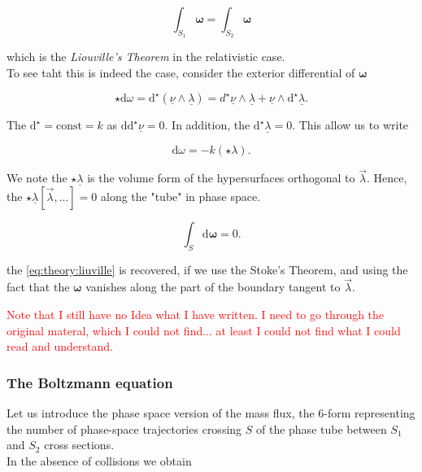 \documentclass[11pt,a4paper,headinclude=true,DIV=14,BCOR=8mm,chapterprefix,listof=totoc,twoside,openright,abstracton]{scrbook}
\begin{document}
\begin{equation}
    \int_{S_1}\boldsymbol{\omega} = \int_{S_2}\boldsymbol{\omega}
    \label{eq:theory:liuville}
\end{equation}

which is the \textit{Liouville’s Theorem} in the relativistic case. \\

To see taht this is indeed the case, consider the exterior differential of $\boldsymbol{\omega}$

\begin{equation}
    \star\text{d}\omega = \text{d}^{\star}(\underline{\nu}\wedge\underline{\lambda}) = d^{\star}\underline{\nu}\wedge\underline{\lambda} + \underline{\nu}\wedge\text{d}^{\star}\underline{\lambda}.
\end{equation}

The $\text{d}^{\star}=\text{const}=k$ as $\text{dd}^{\star}\underline{\nu}=0$. In addition, the $\text{d}^{\star}\underline{\lambda}=0$. This allow us to write 

\begin{equation}
    \text{d}\omega = -k(\star\lambda).
\end{equation}

We note the $\star\underline{\lambda}$ is the volume form of the hypersurfaces orthogonal to $\vec{\lambda}$. Hence, the $\star\underline{\lambda}[\vec{\lambda},...]=0$ along the "tube" in phase space. 

\begin{equation}
    \int_S\text{d}\boldsymbol{\omega} = 0.
\end{equation}

the \ref{eq:theory:liuville} is recovered, if we use the Stoke’s Theorem, and using the fact that the $\boldsymbol{\omega}$ vanishes along the part of the boundary tangent to $\vec{\lambda}$.

\textcolor{red}{Note that I still have no Idea what I have written. I need to go through the original materal, which I could not find... at least I could not find what I could read and understand. }

\subsubsection{The Boltzmann equation}

Let us introduce the phase space version of the mass flux, the 6-form representing the number of phase-space trajectories crossing $S$ of the phase tube between $S_1$ and $S_2$ cross sections. \\
In the absence of collisions we obtain 
\end{document}

